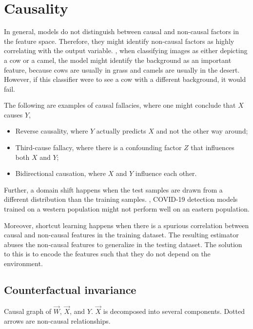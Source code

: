\section{Causality}

In general, models do not distinguish between causal and non-causal factors in the feature space.
Therefore, they might identify non-causal factors as highly correlating with the output variable.
\Eg, when classifying images as either depicting a cow or a camel, the model might identify the
background as an important feature, because cows are usually in grass and camels are usually in the
desert. However, if this classifier were to see a cow with a different background, it would fail.

The following are examples of causal fallacies, where one might conclude that $X$ causes $Y$,
\begin{itemize}
    \item Reverse causality, where $Y$ actually predicts $X$ and not the other way around;
    \item Third-cause fallacy, where there is a confounding factor $Z$ that influences both $X$ and $Y$;
    \item Bidirectional causation, where $X$ and $Y$ influence each other.
\end{itemize}

Further, a domain shift happens when the test samples are drawn from a different distribution than
the training samples. \Eg, COVID-19 detection models trained on a western population might not
perform well on an eastern population.

Moreover, shortcut learning happens when there is a spurious correlation between causal and
non-causal features in the training dataset. The resulting estimator abuses the non-causal features
to generalize in the testing dataset. The solution to this is to encode the features such that they
do not depend on the environment.

\subsection{Counterfactual invariance}

\begin{marginfigure}
    \centering
    \caption{Causal graph of $\vec{W}$, $\vec{X}$, and $Y$. $\vec{X}$ is decomposed into several components. Dotted arrows are non-causal relationships.}
    \label{fig:causal-graph}
\end{marginfigure}

